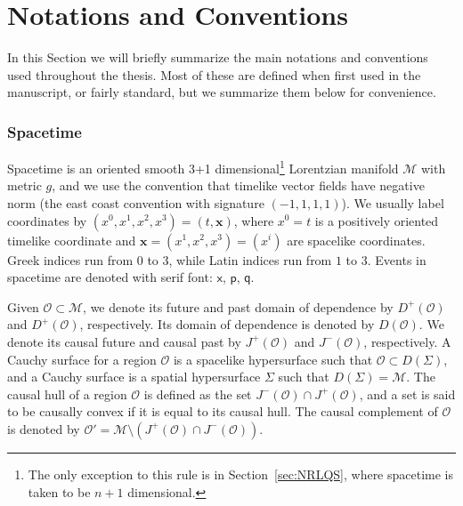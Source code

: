 \documentclass[letterpaper,12pt,titlepage,oneside,final]{book}
\newcommand{\M}{\mathcal{M}}
\newcommand{\mf}{\mathsf}%
\begin{document}




\section*{Notations and Conventions}

In this Section we will briefly summarize the main notations and conventions used throughout the thesis. Most of these are defined when first used in the manuscript, or fairly standard, but we summarize them below for convenience.


\subsubsection*{Spacetime}

Spacetime is an oriented smooth 3+1 dimensional\footnote{The only exception to this rule is in Section~\ref{sec:NRLQS}, where spacetime is taken to be $n+1$ dimensional.} Lorentzian manifold $\M$ with metric $g$, and we use the convention that timelike vector fields have negative norm (the east coast convention with signature $(-1,1,1,1)$). We usually label coordinates by $(x^0,x^1,x^2,x^3) = (t,\bm x)$, where $x^0 = t$ is a positively oriented timelike coordinate and $\bm x = (x^1,x^2,x^3) = (x^i)$ are spacelike coordinates. Greek indices run from $0$ to $3$, while Latin indices run from $1$ to $3$. Events in spacetime are denoted with serif font: $\mf x$, $\mf p$, $\mf q$. 

Given $\mathcal{O}\subset \M$, we denote its future and past domain of dependence by $D^{+}(\mathcal{O})$ and $D^{+}(\mathcal{O})$, respectively. Its domain of dependence is denoted by $D(\mathcal{O})$. We denote its causal future and causal past by $J^{+}(\mathcal{O})$ and $J^{-}(\mathcal{O})$, respectively. A Cauchy surface for a region $\mathcal{O}$ is a spacelike hypersurface such that $\mathcal{O}\subset D(\Sigma)$, and a Cauchy surface is a spatial hypersurface $\Sigma$ such that $D(\Sigma) = \M$. The causal hull of a region $\mathcal{O}$ is defined as the set $J^-(\mathcal{O})\cap J^+(\mathcal{O})$, and a set is said to be causally convex if it is equal to its causal hull. The causal complement of $\mathcal{O}$ is denoted by $\mathcal{O}' = \M\setminus (J^+(\mathcal{O})\cap J^-(\mathcal{O})).$
\end{document}
